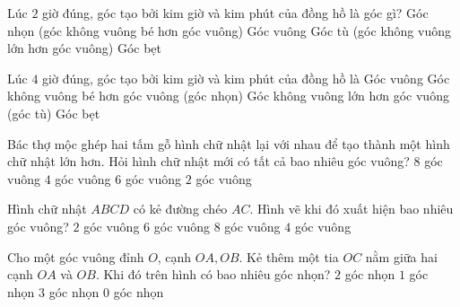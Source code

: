 \begin{ex} %
Lúc $2$ giờ đúng, góc tạo bởi kim giờ và kim phút của đồng hồ là góc gì?
\choice
{\True Góc nhọn (góc không vuông bé hơn góc vuông)}
{Góc vuông}
{Góc tù (góc không vuông lớn hơn góc vuông)}
{Góc bẹt}
\end{ex}

\begin{ex} %
Lúc $4$ giờ đúng, góc tạo bởi kim giờ và kim phút của đồng hồ là
\choice
{Góc vuông}
{Góc không vuông bé hơn góc vuông (góc nhọn)}
{\True Góc không vuông lớn hơn góc vuông (góc tù)}
{Góc bẹt}
\end{ex}

\begin{ex} %
Bác thợ mộc ghép hai tấm gỗ hình chữ nhật lại với nhau để tạo thành một hình chữ nhật lớn hơn. Hỏi hình chữ nhật mới có tất cả bao nhiêu góc vuông?
\choice
{$8$ góc vuông}
{\True $4$ góc vuông}
{$6$ góc vuông}
{$2$ góc vuông}
\end{ex}

\begin{ex} %
Hình chữ nhật $ABCD$ có kẻ đường chéo $AC$. Hình vẽ khi đó xuất hiện bao nhiêu góc vuông?
\choice
{$2$ góc vuông}
{$6$ góc vuông}
{$8$ góc vuông}
{\True $4$ góc vuông}
\end{ex}

\begin{ex} %
Cho một góc vuông đỉnh $O$, cạnh $OA, OB$. Kẻ thêm một tia $OC$ nằm giữa hai cạnh $OA$ và $OB$. Khi đó trên hình có bao nhiêu góc nhọn?
\choice
{\True $2$ góc nhọn}
{$1$ góc nhọn}
{$3$ góc nhọn}
{$0$ góc nhọn}
\end{ex}

